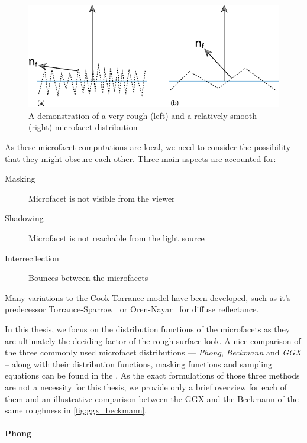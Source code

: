 \begin{figure}[httpb]
	\centering
	\includegraphics[width=.8\linewidth]{img/microfacets.pdf}
	\caption{A demonstration of a very rough (left) and a relatively smooth (right) microfacet distribution~\cite{pharr2016physically}}
	\label{fig:microfacets}
\end{figure}

As these microfacet computations are local, we need to consider the possibility that they might obscure each other. Three main aspects are accounted for:
\begin{description}
	\item[Masking] Microfacet is not visible from the viewer
	\item[Shadowing] Microfacet is not reachable from the light source
	\item[Interrecflection] Bounces between the microfacets
\end{description}

Many variations to the Cook-Torrance model have been developed, such as it's predecessor Torrance-Sparrow~\cite{Torrance1967TheoryFO} or Oren-Nayar~\cite{oren1994generalization} for diffuse reflectance.

In this thesis, we focus on the distribution functions of the microfacets as they are ultimately the deciding factor of the rough surface look. A nice comparison of the three commonly used microfacet distributions --- \emph{Phong}, \emph{Beckmann} and \emph{GGX} -- along with their distribution functions, masking functions and sampling equations can be found in the \citet{walter2007microfacet}. As the exact formulations of those three methods are not a necessity for this thesis, we provide only a brief overview for each of them and an illustrative comparison between the GGX and the Beckmann of the same roughness in 
\autoref{fig:ggx_beckmann}.

\paragraph{Phong}

